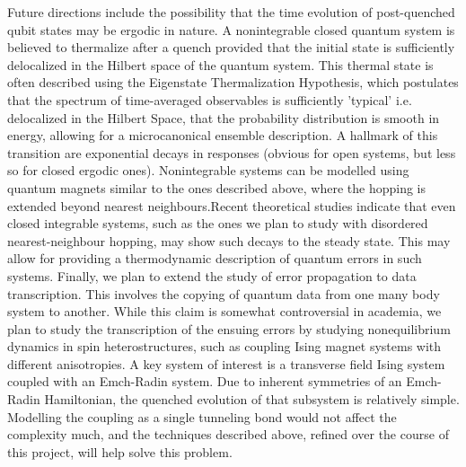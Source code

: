 \documentclass[a4paper,9pt]{article}
\begin{document}
Future directions include the possibility that the time evolution of post-quenched qubit states may be ergodic in nature. A nonintegrable closed quantum system is believed to thermalize after a quench provided that the initial state is sufficiently delocalized in the Hilbert space of the quantum system. This thermal state is often described using the Eigenstate Thermalization Hypothesis, which postulates that the spectrum of time-averaged observables is sufficiently 'typical' i.e. delocalized in the Hilbert Space, that the probability distribution is smooth in energy, allowing for a microcanonical ensemble description. A hallmark of this transition are exponential decays in responses (obvious for open systems, but less so for closed ergodic ones). Nonintegrable systems can be modelled using quantum magnets similar to the ones described above, where the hopping is extended beyond nearest neighbours.Recent theoretical studies indicate that even closed integrable systems, such as the ones we plan to study with 
disordered nearest-neighbour hopping, may show such decays to the steady state. This may allow for providing a thermodynamic description of quantum errors in such systems. Finally, we plan to extend the study of error propagation to data transcription. This involves the copying of quantum data from one many body system to another. While this claim is somewhat controversial in academia, we plan to study the transcription of the ensuing errors by studying nonequilibrium dynamics in spin heterostructures, such as coupling Ising magnet systems with different  anisotropies.  A key system of interest is a transverse field Ising system coupled with an Emch-Radin system. Due to inherent symmetries of an Emch-Radin Hamiltonian, the quenched evolution of that subsystem is relatively simple. Modelling the coupling as a single tunneling bond would not affect the complexity much, and the techniques described above, refined over the course of this project, will help solve this problem.
\end{document}
